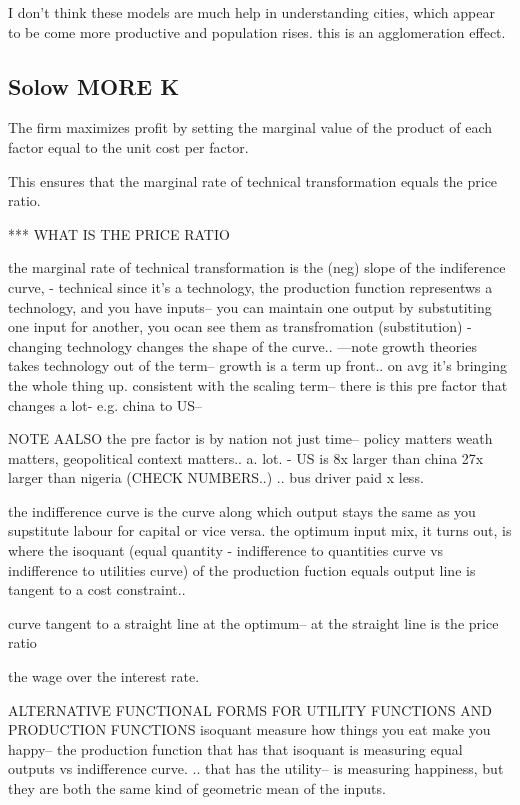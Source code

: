   I don't think these models are much help in understanding cities, which appear to be come more productive and population rises. this is an agglomeration effect.



\subsection{Solow MORE K}

The firm maximizes profit by setting the marginal value of the product of each factor equal to the unit cost per factor. 

This ensures that the marginal rate of technical transformation equals the price ratio. 

*** WHAT IS THE PRICE RATIO

the marginal rate of technical transformation is the (neg) slope of the indiference curve, 
- technical since it's a technology, the production function representws a technology, and you have inputs-- you can maintain one output by substutiting one input for another, you ocan see them as transfromation (substitution)
- changing technology changes the shape of the curve.. ---note growth theories takes technology out of the term-- growth is a term up front.. on avg it's bringing the whole thing up. consistent with the scaling term-- there is this pre factor that changes a lot- e.g. china to US-- 

NOTE AALSO  the pre factor is by nation not just time-- policy matters weath matters, geopolitical context matters.. a. lot. - US is 8x larger than china 27x larger than nigeria (CHECK NUMBERS..) .. bus driver paid x less.


the indifference curve is the curve along which output stays the same as you supstitute labour for capital or vice versa. 
the optimum input mix, it turns out, is where the isoquant (equal quantity - indifference to quantities curve vs indifference to utilities curve) of the production fuction equals output line is tangent to a cost constraint..

curve tangent to a straight line at the optimum-- at the straight line is the price  ratio

the wage over the interest rate. 

ALTERNATIVE FUNCTIONAL FORMS FOR UTILITY FUNCTIONS AND PRODUCTION FUNCTIONS
isoquant measure how things you eat make you happy-- the production function that has that isoquant is measuring equal outputs
vs indifference curve. .. that has the utility-- is measuring happiness, but they are both the same kind of geometric mean of the inputs. 

